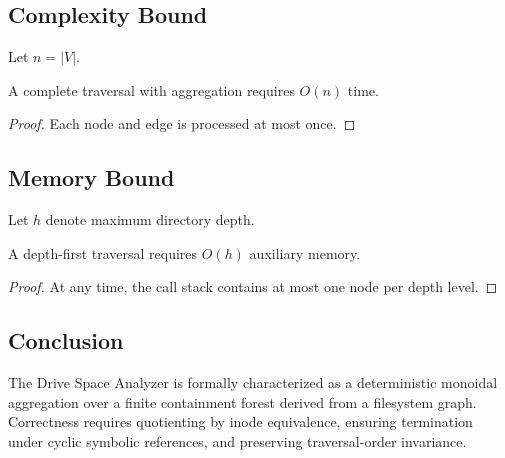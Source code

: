 \subsection*{Complexity Bound}

Let $n = |V|$.

\begin{proposition}
A complete traversal with aggregation requires $O(n)$ time.
\end{proposition}

\begin{proof}
Each node and edge is processed at most once.
\end{proof}

\subsection*{Memory Bound}

Let $h$ denote maximum directory depth.

\begin{proposition}
A depth-first traversal requires $O(h)$ auxiliary memory.
\end{proposition}

\begin{proof}
At any time, the call stack contains at most one node per depth level.
\end{proof}

\subsection*{Conclusion}

The Drive Space Analyzer is formally characterized as a deterministic monoidal aggregation
over a finite containment forest derived from a filesystem graph.
Correctness requires quotienting by inode equivalence, ensuring termination under cyclic symbolic references,
and preserving traversal-order invariance.